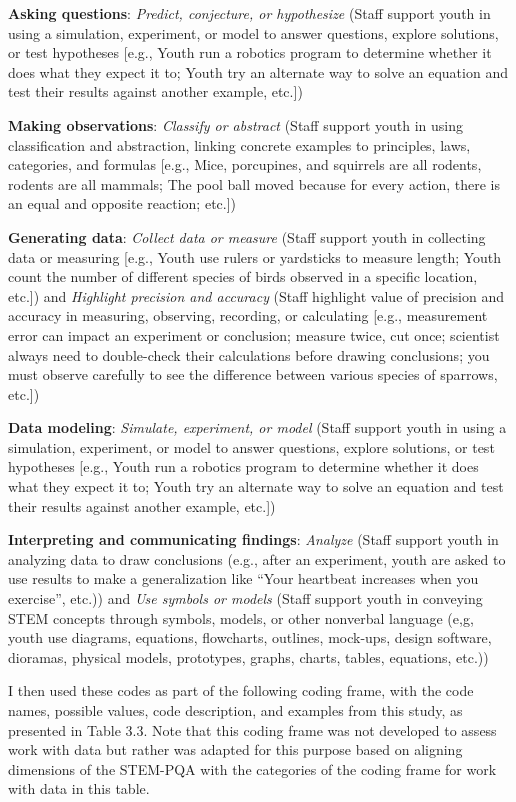\documentclass[]{msu-thesis}
\theoremstyle{definition}
\theoremstyle{definition}
\theoremstyle{definition}
\theoremstyle{remark}
\begin{document}
\textbf{Asking questions}: \emph{Predict, conjecture, or hypothesize}
(Staff support youth in using a simulation, experiment, or model to
answer questions, explore solutions, or test hypotheses {[}e.g., Youth
run a robotics program to determine whether it does what they expect it
to; Youth try an alternate way to solve an equation and test their
results against another example, etc.{]})

\textbf{Making observations}: \emph{Classify or abstract} (Staff support
youth in using classification and abstraction, linking concrete examples
to principles, laws, categories, and formulas {[}e.g., Mice, porcupines,
and squirrels are all rodents, rodents are all mammals; The pool ball
moved because for every action, there is an equal and opposite reaction;
etc.{]})

\textbf{Generating data}: \emph{Collect data or measure} (Staff support
youth in collecting data or measuring {[}e.g., Youth use rulers or
yardsticks to measure length; Youth count the number of different
species of birds observed in a specific location, etc.{]}) and
\emph{Highlight precision and accuracy} (Staff highlight value of
precision and accuracy in measuring, observing, recording, or
calculating {[}e.g., measurement error can impact an experiment or
conclusion; measure twice, cut once; scientist always need to
double-check their calculations before drawing conclusions; you must
observe carefully to see the difference between various species of
sparrows, etc.{]})

\textbf{Data modeling}: \emph{Simulate, experiment, or model} (Staff
support youth in using a simulation, experiment, or model to answer
questions, explore solutions, or test hypotheses {[}e.g., Youth run a
robotics program to determine whether it does what they expect it to;
Youth try an alternate way to solve an equation and test their results
against another example, etc.{]})

\textbf{Interpreting and communicating findings}: \emph{Analyze} (Staff
support youth in analyzing data to draw conclusions (e.g., after an
experiment, youth are asked to use results to make a generalization like
``Your heartbeat increases when you exercise'', etc.)) and \emph{Use
symbols or models} (Staff support youth in conveying STEM concepts
through symbols, models, or other nonverbal language (e,g, youth use
diagrams, equations, flowcharts, outlines, mock-ups, design software,
dioramas, physical models, prototypes, graphs, charts, tables,
equations, etc.))

I then used these codes as part of the following coding frame, with the
code names, possible values, code description, and examples from this
study, as presented in Table 3.3. Note that this coding frame was not
developed to assess work with data but rather was adapted for this
purpose based on aligning dimensions of the STEM-PQA with the categories
of the coding frame for work with data in this table.
\end{document}
